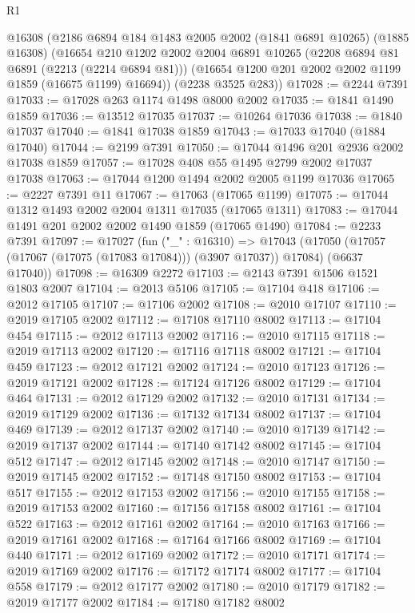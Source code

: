 \begin{lexlean}{R1}
\begin{coremodule}
    @16308
    (@2186
      @6894
      @184
      @1483
      @2005
      @2002
      (@1841 @6891 @10265)
      (@1885 @16308)
      (@16654
        @210
        @1202
        @2002
        @2004
        @6891
        @10265
        (@2208 @6894 @81 @6891 (@2213 (@2214 @6894 @81)))
        (@16654 @1200 @201 @2002 @2002 @1199 @1859 (@16675 @1199) @16694))
      (@2238 @3525 @283))
@17028 := @2244 @7391
@17033 := @17028 @263 @1174 @1498 @8000 @2002
@17035 := @1841 @1490 @1859
@17036 := @13512 @17035
@17037 := @10264 @17036
@17038 := @1840 @17037
@17040 := @1841 @17038 @1859
@17043 := @17033 @17040 (@1884 @17040)
@17044 := @2199 @7391
@17050 := @17044 @1496 @201 @2936 @2002 @17038 @1859
@17057 := @17028 @408 @55 @1495 @2799 @2002 @17037 @17038
@17063 := @17044 @1200 @1494 @2002 @2005 @1199 @17036
@17065 := @2227 @7391 @11
@17067 := @17063 (@17065 @1199)
@17075 := @17044 @1312 @1493 @2002 @2004 @1311 @17035 (@17065 @1311)
@17083 := @17044 @1491 @201 @2002 @2002 @1490 @1859 (@17065 @1490)
@17084 := @2233 @7391
@17097 := @17027
    (fun ("_" : @16310) =>
    @17043 (@17050 (@17057 (@17067 (@17075 (@17083 @17084))) (@3907 @17037)) @17084) (@6637 @17040))
@17098 := @16309 @2272
@17103 := @2143 @7391 @1506 @1521 @1803 @2007
@17104 := @2013 @5106
@17105 := @17104 @418
@17106 := @2012 @17105
@17107 := @17106 @2002
@17108 := @2010 @17107
@17110 := @2019 @17105 @2002
@17112 := @17108 @17110 @8002
@17113 := @17104 @454
@17115 := @2012 @17113 @2002
@17116 := @2010 @17115
@17118 := @2019 @17113 @2002
@17120 := @17116 @17118 @8002
@17121 := @17104 @459
@17123 := @2012 @17121 @2002
@17124 := @2010 @17123
@17126 := @2019 @17121 @2002
@17128 := @17124 @17126 @8002
@17129 := @17104 @464
@17131 := @2012 @17129 @2002
@17132 := @2010 @17131
@17134 := @2019 @17129 @2002
@17136 := @17132 @17134 @8002
@17137 := @17104 @469
@17139 := @2012 @17137 @2002
@17140 := @2010 @17139
@17142 := @2019 @17137 @2002
@17144 := @17140 @17142 @8002
@17145 := @17104 @512
@17147 := @2012 @17145 @2002
@17148 := @2010 @17147
@17150 := @2019 @17145 @2002
@17152 := @17148 @17150 @8002
@17153 := @17104 @517
@17155 := @2012 @17153 @2002
@17156 := @2010 @17155
@17158 := @2019 @17153 @2002
@17160 := @17156 @17158 @8002
@17161 := @17104 @522
@17163 := @2012 @17161 @2002
@17164 := @2010 @17163
@17166 := @2019 @17161 @2002
@17168 := @17164 @17166 @8002
@17169 := @17104 @440
@17171 := @2012 @17169 @2002
@17172 := @2010 @17171
@17174 := @2019 @17169 @2002
@17176 := @17172 @17174 @8002
@17177 := @17104 @558
@17179 := @2012 @17177 @2002
@17180 := @2010 @17179
@17182 := @2019 @17177 @2002
@17184 := @17180 @17182 @8002

\end{coremodule}
\end{lexlean}
